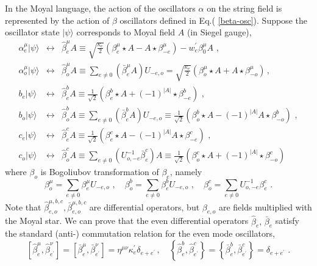 \documentclass[a4paper,aps,preprint,nofootinbib,eqsecnum]{revtex4}
\begin{document}
In the Moyal language, the action of the oscillators $\alpha $ on the string
field is represented by the action of $\beta $ oscillators defined in Eq.(%
\ref{beta-osc}). Suppose the oscillator state $|\psi \rangle $ corresponds
to Moyal field $A$ (in Siegel gauge),
\begin{eqnarray}
\alpha _{e}^{\mu }|\psi \rangle  &\longleftrightarrow &\hat{\beta}_{e}^{\mu
}A\equiv \sqrt{\frac{\kappa _{e}}{2}}(\beta _{e}^{\mu }\star A-A\star \beta
_{-e}^{\mu })-w_{e}^{\prime }\beta _{0}^{\mu }A\,\,, \\
\alpha _{o}^{\mu }|\psi \rangle  &\longleftrightarrow &\hat{\beta}_{o}^{\mu
}A\equiv \sum_{e\neq 0}(\bar{\beta}_{e}^{\mu }A)U_{-e,o}=\sqrt{\frac{\kappa
_{e}}{2}}(\beta _{o}^{\mu }\star A+A\star \beta _{-o}^{\mu })\,, \\
b_{e}|\psi \rangle  &\longleftrightarrow &\hat{\beta}_{e}^{b}A\equiv \frac{1%
}{\sqrt{2}}\left( \beta _{e}^{b}\star A+(-1)^{|A|}\star \beta
_{-e}^{b}\right)\,\,,  \\
b_{o}|\psi \rangle  &\longleftrightarrow &\hat{\beta}_{o}^{b}A\equiv
\sum_{e\neq 0}(\bar{\beta}_{e}^{b}A)U_{-e,o}\equiv \frac{1}{\sqrt{2}}\left(
\beta _{o}^{b}\star A-(-1)^{|A|}A\star \beta _{-o}^{b}\right)
\,\,,\\
c_{e}|\psi \rangle  &\longleftrightarrow &\hat{\beta}_{e}^{c}A\equiv \frac{1%
}{\sqrt{2}}\left( \beta _{e}^{c}\star A-(-1)^{|A|}A\star \beta
_{-e}^{c}\right) \,\,, \\
c_{o}|\psi \rangle  &\longleftrightarrow &\hat{\beta}_{o}^{c}A\equiv
\sum_{e\neq 0}(U_{o,-e}^{-1}\bar{\beta}_{e}^{c})A\equiv \frac{1}{\sqrt{2}}%
\left( \beta _{o}^{c}\star A+(-1)^{|A|}\star \beta _{-o}^{c}\right)
\end{eqnarray}%
where $\beta _{o}$ is Bogoliubov transformation of $\beta _{e}$, namely
\begin{equation}
\beta _{o}^{\mu }=\sum_{e\neq 0}\beta _{e}^{\mu }U_{-e,o}\,\,,
\quad\beta
_{o}^{b}=\sum_{e\neq 0}\beta _{e}^{b}U_{-e,o}\,\,,\quad\beta
_{o}^{c}=\sum_{e\neq 0}U_{o,-e}^{-1}\beta _{e}^{c}\,\,.
\end{equation}%
Note that $\hat{\beta}_{e,o}^{\mu ,b,c},\bar{\beta}_{e,o}^{\mu ,b,c}$ are
differential operators, but $\beta _{e,o}$ are fields multiplied with the
Moyal star. We can prove that the even differential operators $\hat{\beta}%
_{e},\,\bar{\beta}_{e}$ satisfy the standard
(anti-) commutation relation for the
even mode oscillators,
\begin{equation}
\left[ \hat{\beta}_{e}^{\mu },\hat{\beta}_{e^{\prime }}^{\nu }\right] =\left[
\bar{\beta}_{e}^{\mu },\bar{\beta}_{e^{\prime }}^{\nu }\right] =\eta ^{\mu
\nu }\kappa _{e}^{\prime }\delta _{e+e^{\prime }}\,,\quad \left\{ \hat{\beta}%
_{e}^{b},\hat{\beta}_{e^{\prime }}^{c}\right\} =\left\{ \bar{\beta}_{e}^{b},%
\bar{\beta}_{e^{\prime }}^{c}\right\} =\delta _{e+e^{\prime }}\,\,.
\end{equation}%
\end{document}

